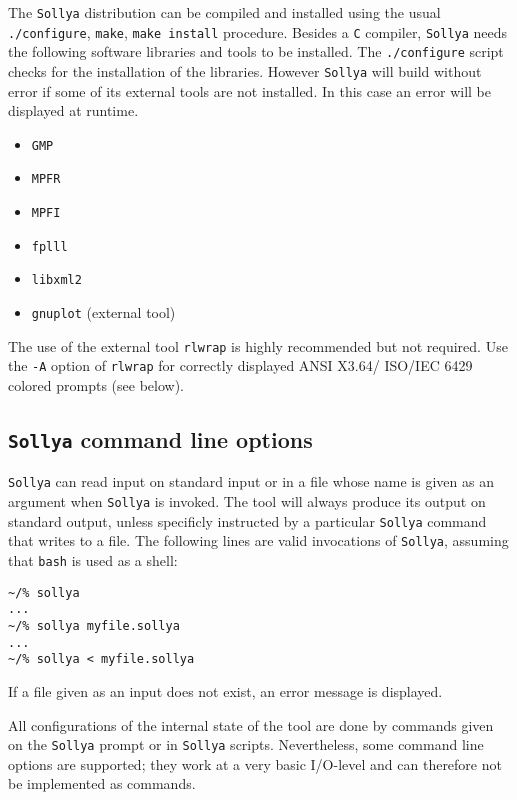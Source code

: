 \documentclass[a4paper]{article}
\newcommand{\sollya}{\texttt{Sollya}\xspace}
\begin{document}
The \sollya distribution can be compiled and installed using the usual
\texttt{./configure}, \texttt{make}, \texttt{make install}
procedure. Besides a \texttt{C} compiler, \sollya needs the following
software libraries and tools to be installed. The \texttt{./configure}
script checks for the installation of the libraries. However \sollya
will build without error if some of its external tools are not
installed. In this case an error will be displayed at runtime.
\begin{itemize}
\item \texttt{GMP}
\item \texttt{MPFR}
\item \texttt{MPFI}
\item \texttt{fplll}
\item \texttt{libxml2}
\item \texttt{gnuplot} (external tool)
\end{itemize}
The use of the external tool \texttt{rlwrap} is highly recommended but
not required. Use the \texttt{-A} option of \texttt{rlwrap} for
correctly displayed ANSI X3.64/ ISO/IEC 6429 colored prompts (see
below).

\subsection{\sollya command line options}

\sollya can read input on standard input or in a file whose name is given 
as an argument when \sollya is invoked. The tool will always produce its 
output on standard output, unless specificly instructed by a particular
\sollya command that writes to a file.
The following lines are valid invocations of \sollya, assuming that 
\texttt{bash} is used as a shell:
\begin{center}\begin{minipage}{15cm}\begin{Verbatim}[frame=single]
~/% sollya
...
~/% sollya myfile.sollya
...
~/% sollya < myfile.sollya
\end{Verbatim}
\end{minipage}\end{center}
If a file given as an input does not exist, an error message is displayed.

All configurations of the internal state of the tool are done by
commands given on the \sollya prompt or in \sollya
scripts. Nevertheless, some command line options are supported; they
work at a very basic I/O-level and can therefore not be implemented as
commands.
\end{document}
